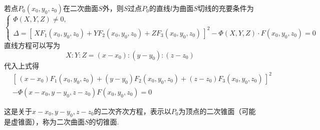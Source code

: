 \theorem[切锥面]
若点$P_0(x_0,y_0,z_0)$在二次曲面$S$外，则$S$过点$P_0$的直线$l$为曲面$S$切线的充要条件为
\begin{equation}
\begin{cases}
\varPhi(X,Y,Z)\ne 0,\\
\Delta = \left[ \,XF_1(x_0,y_0,z_0)  +YF_2(x_0,y_0,z_0)+ZF_3(x_0,y_0,z_0)\,\right] ^2-\varPhi(X,Y,Z)\cdot F(x_0,y_0,z_0) = 0
\end{cases}
\end{equation}
直线方程可以写为
$$X:Y:Z=(x-x_0):(y-y_0):(z-z_0)$$
代入上式得
\begin{equation}
\begin{split}
&[\, (x-x_0)F_1(x_0,y_0,z_0)+(y-y_0)F_2(x_0,y_0,z_0)+(z-z_0)F_3(x_0,y_0,z_0)\,]^2\\
&-\varPhi(x-x_0,y-y_0,z-z_0)F(x_0,y_0,z_0) = 0
\end{split}
\end{equation}
\par 这是关于$x-x_0,y-y_0,z-z_0$的二次齐次方程，表示以$P_0$为顶点的二次锥面（可能是虚锥面），称为二次曲面$S$的{\color{dy}切锥面}.

